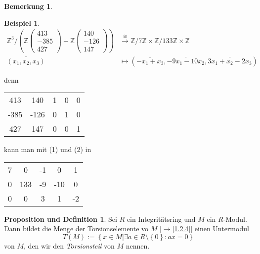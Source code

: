 \documentclass[
twoside=semi,
fontsize=12,
DIV=12, 
cleardoublepage=current,
leqno,
headings=optiontoheadandtoc, 
toc=idx
]{scrbook}
\newcommand{\Z}{\mathbb{Z}}
\newcommand{\brac}[1]{\left( #1 \right)}
\newcommand{\set}[1]{\left\{ #1 \right\}}
\theoremstyle{definition}
\newtheorem{bemerkung}[definition]{Bemerkung}
\newtheorem{beispiel}[definition]{Beispiel}
\newtheorem{prop-def}[definition]{Proposition und Definition}
\begin{document}
\begin{bemerkung}
		\begin{beispiel}\label{1.6.7}
			\begin{align*}
				\Z^3 / \brac{\Z\begin{pmatrix}
						413\\-385\\427
					\end{pmatrix} + \Z\begin{pmatrix}
						140\\-126\\147
				\end{pmatrix}} &\overset{\cong}{\to} \Z/7\Z \times \Z/133\Z \times \Z\\
				\overline{(x_1, x_2, x_3)} &\mapsto (\overline{-x_1+x_3}, \overline{-9x_1-10x_2},\overline{3x_1+x_2-2x_3})
			\end{align*}
			
			denn \begin{tabular}{|cc|ccc|}\hline
			413& 140 & 1 & 0 & 0\\
			-385& -126 & 0 & 1 & 0\\
			427& 147 & 0 & 0 & 1\\\hline
		\end{tabular} kann man mit (1) und (2) in \begin{tabular}{|cc|ccc|}\hline
			7& 0 & -1 & 0 & 1\\
			0& 133 & -9 &-10 & 0\\
			0& 0 & 3 & 1 & -2\\\hline
		\end{tabular}
		
		\end{beispiel}
	\end{bemerkung}

	\begin{prop-def}\label{1.6.8}
		Sei $R$ ein Integrit\"atsring und $M$ ein $R$-Modul. Dann bildet die Menge der Torsionselemente vo $M$ [$\to$\ref{1.2.4}] einen Untermodul
			\[T(M):= \set{x \in M| \exists a \in R \setminus \set{0}: ax = 0}\]
		von $M$, den wir den \emph{Torsionsteil} von $M$ nennen.
	\end{prop-def}
\end{document}
